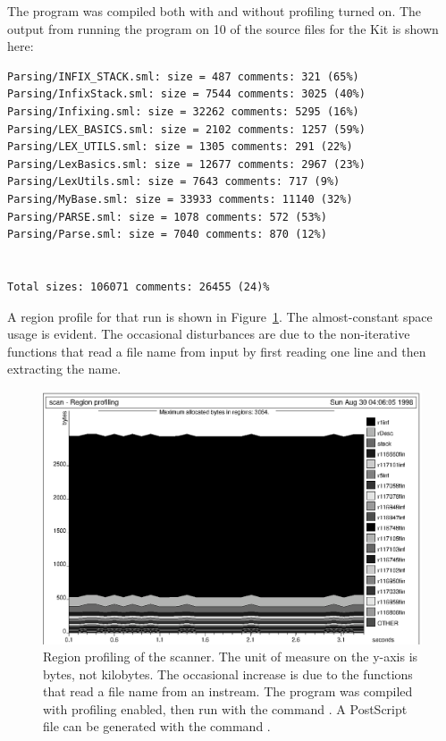 \documentclass[12pt]{book}
\begin{document}
The program was compiled both with and without profiling turned on.
The output from running the program on 10 of the source files for the
Kit is shown here:
\begin{verbatim}
Parsing/INFIX_STACK.sml: size = 487 comments: 321 (65%)
Parsing/InfixStack.sml: size = 7544 comments: 3025 (40%)
Parsing/Infixing.sml: size = 32262 comments: 5295 (16%)
Parsing/LEX_BASICS.sml: size = 2102 comments: 1257 (59%)
Parsing/LEX_UTILS.sml: size = 1305 comments: 291 (22%)
Parsing/LexBasics.sml: size = 12677 comments: 2967 (23%)
Parsing/LexUtils.sml: size = 7643 comments: 717 (9%)
Parsing/MyBase.sml: size = 33933 comments: 11140 (32%)
Parsing/PARSE.sml: size = 1078 comments: 572 (53%)
Parsing/Parse.sml: size = 7040 comments: 870 (12%)


Total sizes: 106071 comments: 26455 (24)%
\end{verbatim}
A region profile for that run is shown in Figure~\ref{scan.fig}.  The
almost-constant space usage is evident. The occasional disturbances
are due to the non-iterative functions that read a file name from
input by first reading one line and then extracting the name.
\begin{figure}
\begin{center}
\includegraphics{scan.ps}
\end{center}
\caption{Region profiling of the scanner. The unit of measure on 
  the y-axis is bytes, not kilobytes. The occasional increase is due
  to the functions that read a file name from an instream.  The
  program was compiled with profiling enabled, then run with the
  command . A
  PostScript file  can be generated with the command
  .  }
\label{scan.fig}
\end{figure}
%
%
\end{document}
